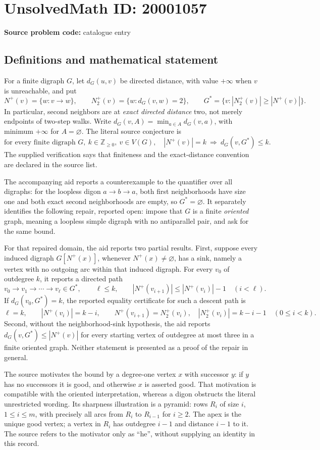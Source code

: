 \documentclass[11pt]{article}
\newcommand{\Z}{\mathbb{Z}}
\begin{document}
\section*{UnsolvedMath ID: 20001057}
\textbf{Source problem code:} catalogue entry
\subsection{Definitions and mathematical statement}
For a finite digraph \(G\), let \(d_G(u,v)\) be directed distance, with value \(+\infty\) when \(v\) is unreachable, and put
\[
 N^+(v)=\{w:v\to w\},\qquad N_2^+(v)=\{w:d_G(v,w)=2\},\qquad
 G^*=\{v:|N_2^+(v)|\geq|N^+(v)|\}.
\]
In particular, second neighbors are at \emph{exact directed distance} two, not merely endpoints of two-step walks. Write \(d_G(v,A)=\min_{a\in A}d_G(v,a)\), with minimum \(+\infty\) for \(A=\varnothing\). The literal source conjecture is
\[
 \text{for every finite digraph }G,\ k\in\Z_{\geq0},\ v\in V(G),\quad
 |N^+(v)|=k\ \Longrightarrow\ d_G(v,G^*)\leq k.
\]
The supplied verification says that finiteness and the exact-distance convention are declared in the source list.

The accompanying aid reports a counterexample to the quantifier over all digraphs: for the loopless digon \(a\to b\to a\), both first neighborhoods have size one and both exact second neighborhoods are empty, so \(G^*=\varnothing\). It separately identifies the following repair, reported open: impose that \(G\) is a finite \emph{oriented} graph, meaning a loopless simple digraph with no antiparallel pair, and ask for the same bound.

For that repaired domain, the aid reports two partial results. First, suppose every induced digraph \(G[N^+(x)]\), whenever \(N^+(x)\ne\varnothing\), has a sink, namely a vertex with no outgoing arc within that induced digraph. For every \(v_0\) of outdegree \(k\), it reports a directed path
\[
 v_0\to v_1\to\cdots\to v_\ell\in G^*,\qquad \ell\leq k,
 \qquad |N^+(v_{i+1})|\leq|N^+(v_i)|-1\quad(i<\ell).
\]
If \(d_G(v_0,G^*)=k\), the reported equality certificate for such a descent path is
\[
 \ell=k,\qquad |N^+(v_i)|=k-i,\qquad
 N^+(v_{i+1})=N_2^+(v_i),\quad |N_2^+(v_i)|=k-i-1\quad(0\leq i<k).
\]
Second, without the neighborhood-sink hypothesis, the aid reports \(d_G(v,G^*)\leq |N^+(v)|\) for every starting vertex of outdegree at most three in a finite oriented graph. Neither statement is presented as a proof of the repair in general.

The source motivates the bound by a degree-one vertex \(x\) with successor \(y\): if \(y\) has no successors it is good, and otherwise \(x\) is asserted good. That motivation is compatible with the oriented interpretation, whereas a digon obstructs the literal unrestricted wording. Its sharpness illustration is a pyramid: rows \(R_i\) of size \(i\), \(1\leq i\leq m\), with precisely all arcs from \(R_i\) to \(R_{i-1}\) for \(i\geq2\). The apex is the unique good vertex; a vertex in \(R_i\) has outdegree \(i-1\) and distance \(i-1\) to it. The source refers to the motivator only as ``he'', without supplying an identity in this record.
\end{document}
